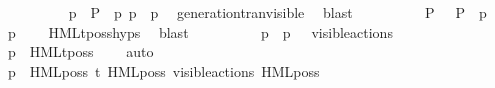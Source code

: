 \begin{isabellebody}
\ \ \ \ \ \ \ \ \isamarkupfalse%
\ p{\isacharprime}{\kern0pt}\ \ {\isacartoucheopen}P{\isacharprime}{\kern0pt}\ {\isacharequal}{\kern0pt}\ {\isasymtheta}{\isacharparenleft}{\kern0pt}p{\isacharprime}{\kern0pt}{\isacharparenright}{\kern0pt}{\isacartoucheclose}\ {\isacartoucheopen}p\ {\isasymlongmapsto}{\isasymalpha}\ p{\isacharprime}{\kern0pt}{\isacartoucheclose}\ \isamarkupfalse%
\ generation{\isacharunderscore}{\kern0pt}tran{\isacharunderscore}{\kern0pt}visible\ \isamarkupfalse%
\ blast\isanewline
\ \ \ \ \ \ \ \ \isamarkupfalse%
\ {\isacartoucheopen}P{\isacharprime}{\kern0pt}\ {\isasymTurnstile}\ {\isasymsigma}{\isacharparenleft}{\kern0pt}{\isasymphi}{\isacharparenright}{\kern0pt}{\isacartoucheclose}\ {\isacartoucheopen}P{\isacharprime}{\kern0pt}\ {\isacharequal}{\kern0pt}\ {\isasymtheta}{\isacharparenleft}{\kern0pt}p{\isacharprime}{\kern0pt}{\isacharparenright}{\kern0pt}{\isacartoucheclose}\ \isamarkupfalse%
\ {\isacartoucheopen}p{\isacharprime}{\kern0pt}\ {\isasymTTurnstile}\ {\isasymphi}{\isacartoucheclose}\ \isamarkupfalse%
\ HMLt{\isacharunderscore}{\kern0pt}poss{\isachardot}{\kern0pt}hyps\ \isamarkupfalse%
\ blast\isanewline
\isanewline
\ \ \ \ \ \ \ \ \isamarkupfalse%
\ {\isacartoucheopen}p\ {\isasymlongmapsto}{\isasymalpha}\ p{\isacharprime}{\kern0pt}{\isacartoucheclose}\ {\isacartoucheopen}{\isasymalpha}\ {\isasymin}\ visible{\isacharunderscore}{\kern0pt}actions{\isacartoucheclose}\ \isamarkupfalse%
\ {\isacartoucheopen}p\ {\isasymTTurnstile}\ HMLt{\isacharunderscore}{\kern0pt}poss\ {\isasymalpha}\ {\isasymphi}{\isacartoucheclose}\ \isamarkupfalse%
\ auto\isanewline
\ \ \ \ \ \ \isamarkupfalse%
\isanewline
\ \ \ \ \ \ \ \ \isamarkupfalse%
\ {\isacartoucheopen}{\isasymtheta}{\isacharparenleft}{\kern0pt}p{\isacharparenright}{\kern0pt}\ {\isasymTurnstile}\ HML{\isacharunderscore}{\kern0pt}poss\ t{\isacharunderscore}{\kern0pt}{\isasymepsilon}\ {\isacharparenleft}{\kern0pt}HML{\isacharunderscore}{\kern0pt}poss\ {\isacharparenleft}{\kern0pt}{\isasymepsilon}{\isacharbrackleft}{\kern0pt}visible{\isacharunderscore}{\kern0pt}actions{\isacharbrackright}{\kern0pt}{\isacharparenright}{\kern0pt}\ {\isacharparenleft}{\kern0pt}HML{\isacharunderscore}{\kern0pt}poss\ {\isasymalpha}\ {\isasymsigma}{\isacharparenleft}{\kern0pt}{\isasymphi}{\isacharparenright}{\kern0pt}{\isacharparenright}{\kern0pt}{\isacharparenright}{\kern0pt}{\isacartoucheclose}\isanewline

\end{isabellebody}
